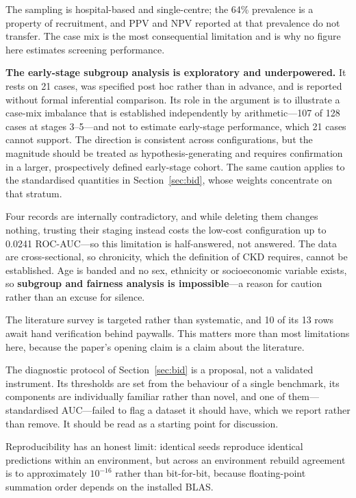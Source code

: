 \documentclass[conference]{IEEEtran}
\begin{document}
The sampling is hospital-based and single-centre; the 64\% prevalence is a
property of recruitment, and PPV and NPV reported at that prevalence do not
transfer. The case mix is the most consequential limitation and is why no
figure here estimates screening performance.

\textbf{The early-stage subgroup analysis is exploratory and underpowered.}
It rests on 21 cases, was specified post hoc rather than in advance, and is
reported without formal inferential comparison. Its role in the argument is
to illustrate a case-mix imbalance that is established independently by
arithmetic---107 of 128 cases at stages 3--5---and not to estimate
early-stage performance, which 21 cases cannot support. The direction is
consistent across configurations, but the magnitude should be treated as
hypothesis-generating and requires confirmation in a larger, prospectively
defined early-stage cohort. The same caution applies to the standardised
quantities in Section~\ref{sec:bid}, whose weights concentrate on that
stratum.

Four records are internally
contradictory, and while deleting them changes nothing, trusting their staging
instead costs the low-cost configuration up to 0.0241 ROC-AUC---so this
limitation is half-answered, not answered. The data are cross-sectional, so
chronicity, which the definition of CKD requires, cannot be established. Age is
banded and no sex, ethnicity or socioeconomic variable exists, so
\textbf{subgroup and fairness analysis is impossible}---a reason for caution
rather than an excuse for silence.

The literature survey is targeted rather than systematic, and 10 of its 13
rows await hand verification behind paywalls. This matters more than most
limitations here, because the paper's opening claim is a claim about the
literature.

The diagnostic protocol of Section~\ref{sec:bid} is a proposal, not a
validated instrument. Its thresholds are set from the behaviour of a single
benchmark, its components are individually familiar rather than novel, and
one of them---standardised AUC---failed to flag a dataset it should have,
which we report rather than remove. It should be read as a starting point for
discussion.

Reproducibility has an honest limit: identical seeds reproduce identical
predictions within an environment, but across an environment rebuild
agreement is to approximately $10^{-16}$ rather than bit-for-bit, because
floating-point summation order depends on the installed BLAS.
\end{document}
